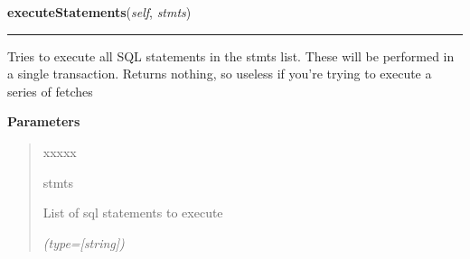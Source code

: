     \label{src:dao:base_dao:BaseDAO:executeStatements}

    \vspace{0.5ex}

\hspace{.8\funcindent}\begin{boxedminipage}{\funcwidth}

    \raggedright \textbf{executeStatements}(\textit{self}, \textit{stmts})

    \vspace{-1.5ex}

    \rule{\textwidth}{0.5\fboxrule}
\setlength{\parskip}{2ex}
    Tries to execute all SQL statements in the stmts list. These will be 
    performed in a single transaction. Returns nothing, so useless if 
    you're trying to execute a series of fetches

\setlength{\parskip}{1ex}
      \textbf{Parameters}
      \vspace{-1ex}

      \begin{quote}
        \begin{Ventry}{xxxxx}

          \item[stmts]

          List of sql statements to execute

            {\it (type=[string])}

        \end{Ventry}

      \end{quote}

    \end{boxedminipage}

    \label{src:dao:base_dao:BaseDAO:basicTopSelect}

    \vspace{0.5ex}

